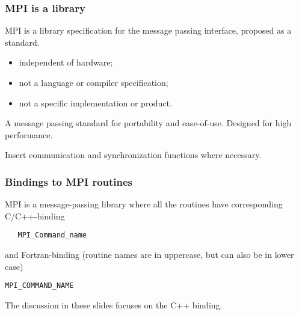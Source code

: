 \documentclass{beamer}
\begin{document}
\begin{frame}
\frametitle{MPI is a library}

\begin{block}{}
MPI is a library specification for the message passing interface,
proposed as a standard.

\begin{itemize}
\item independent of hardware;

\item not a language or compiler specification;

\item not a specific implementation or product.
\end{itemize}

\noindent
A message passing standard for portability and ease-of-use. 
Designed for high performance.

Insert communication and synchronization functions where necessary.


\end{block}
\end{frame}

\begin{frame}
\frametitle{Bindings to MPI routines}

\begin{block}{}


MPI is a message-passing library where all the routines
have corresponding C/C++-binding
\begin{verbatim}
   MPI_Command_name
\end{verbatim}
and Fortran-binding (routine names are in uppercase, but can also be in lower case)
\begin{Verbatim}[numbers=none,fontsize=\fontsize{9pt}{9pt},baselinestretch=0.95]
   MPI_COMMAND_NAME
\end{Verbatim}
The discussion in these slides focuses on the C++ binding.

\end{block}
\end{frame}
\end{document}

